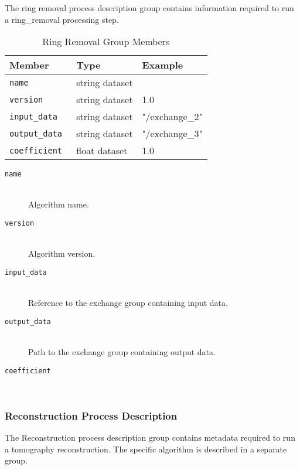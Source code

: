 The ring removal process description group contains information required to run a ring\_removal processing step.

\begin{table}[h!]\sffamily \footnotesize
\caption{Ring Removal Group Members}
\centering
{}
\begin{tabular}{l l l}
\toprule
\bfseries Member & \bfseries Type & \bfseries Example \\
\midrule
\tt{name} & string dataset &  \\  
\tt{version}  & string dataset  & 1.0 \\
\tt{input\_data} &  string dataset & "/exchange\_2" \\
\tt{output\_data} & string dataset & "/exchange\_3" \\
\tt{coefficient} & float dataset &  1.0 \\
\bottomrule
\end{tabular}
\label{table:ringremoval}
\end{table}

\begin{description}
\item[\tt{name}] \hfill \\
{Algorithm name.}

\item[\tt{version}] \hfill \\
{Algorithm version.}

\item[\tt{input\_data}] \hfill \\
{Reference to the exchange group containing input data.}

\item[\tt{output\_data}] \hfill \\
{Path to the exchange group containing output data.}

\item[\tt{coefficient}] \hfill \\
{}
\end{description}

\subsubsection{Reconstruction Process Description}
\label{table:reconstruction}

The Reconstruction process description group contains metadata required to run a tomography reconstruction. The specific algorithm is described in a separate group.

